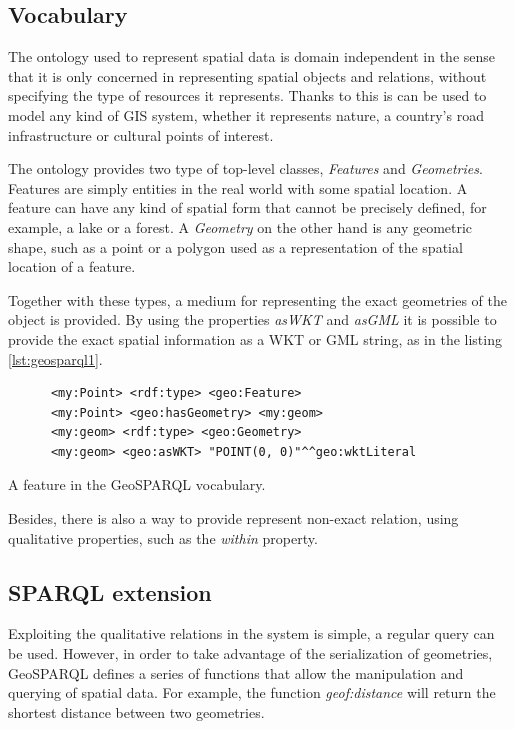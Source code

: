 \subsection*{Vocabulary}

The ontology used to represent spatial data is domain independent in the sense that it is only concerned in representing spatial objects and relations, without specifying the type of resources it represents. Thanks to this is can be used to model any kind of GIS system, whether it represents nature, a country's road infrastructure or cultural points of interest.

The ontology provides two type of top-level classes, \textit{Features} and \textit{Geometries}. Features are simply entities in the real world with some spatial location. A feature can have any kind of spatial form that cannot be precisely defined, for example, a lake or a forest. A \textit{Geometry} on the other hand is any geometric shape, such as a point or a polygon used as a representation of the spatial location of a feature.

Together with these types, a medium for representing the exact geometries of the object is provided. By using the properties \textit{asWKT} and \textit{asGML} it is possible to provide the exact spatial information as a WKT or GML \cite{gmlspec} string, as in the listing \ref{lst:geosparql1}.

\begin{listing}[ht]\centering
  \begin{minipage}{.6\textwidth}
    \begin{verbatim}
      <my:Point> <rdf:type> <geo:Feature> 
      <my:Point> <geo:hasGeometry> <my:geom>
      <my:geom> <rdf:type> <geo:Geometry>
      <my:geom> <geo:asWKT> "POINT(0, 0)"^^geo:wktLiteral
    \end{verbatim}
  \end{minipage}
  \caption{A feature in the GeoSPARQL vocabulary.}\label{lst:geosparql1}
\end{listing}

Besides, there is also a way to provide represent non-exact relation, using qualitative properties, such as the \textit{within} property.

\subsection*{SPARQL extension}

Exploiting the qualitative relations in the system is simple, a regular query can be used. However, in order to take advantage of the serialization of geometries, GeoSPARQL defines a series of functions that allow the manipulation and querying of spatial data. For example, the function \textit{geof:distance} will return the shortest distance between two geometries.

